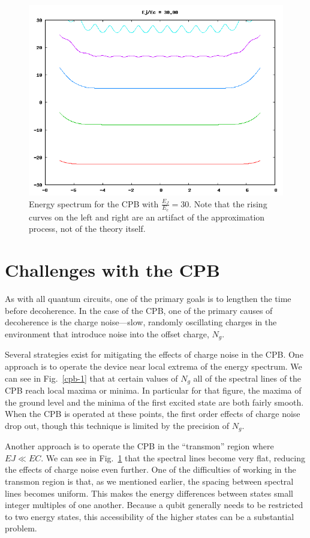 \documentclass[twocolumn]{revtex4}
\newcommand{\picwidth}{0.66\linewidth}
\begin{document}
\begin{figure}
  \includegraphics[width=\picwidth]{CPB-30.png}
  \caption{Energy spectrum for the CPB with $\frac{E_J}{E_c}=30$. Note
    that the rising curves on the left and right are an artifact of
    the approximation process, not of the theory itself.}
  \label{cpb-30}
\end{figure}

\section{Challenges with the CPB}
As with all quantum circuits, one of the primary goals is to lengthen
the time before decoherence. In the case of the CPB, one of the
primary causes of decoherence is the charge noise---slow, randomly
oscillating charges in the environment that introduce noise into the
offset charge, $N_g$.

Several strategies exist for mitigating the effects of charge noise in
the CPB. One approach is to operate the device near local extrema of
the energy spectrum. We can see in Fig.\ \ref{cpb-1} that at certain
values of $N_g$ all of the spectral lines of the CPB reach local
maxima or minima. In particular for that figure, the maxima of the
ground level and the minima of the first excited state are both fairly
smooth. When the CPB is operated at these points, the first order
effects of charge noise drop out, though this technique is limited by
the precision of $N_g$.

Another approach is to operate the CPB in the ``transmon'' region
where $EJ\ll EC$. We can see in Fig.\ \ref{cpb-30} that the spectral
lines become very flat, reducing the effects of charge noise even
further. One of the difficulties of working in the transmon region is
that, as we mentioned earlier, the spacing between spectral lines
becomes uniform. This makes the energy differences between states
small integer multiples of one another. Because a qubit generally
needs to be restricted to two energy states, this accessibility of the
higher states can be a substantial problem.
\end{document}
